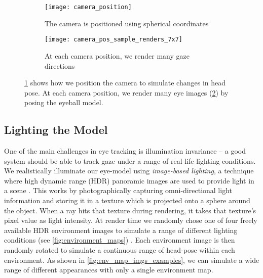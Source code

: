 \begin{figure}
    \centering
    \begin{subfigure}[t]{0.48\columnwidth}
        \texttt{[image: camera\_position]}
        \caption{The camera is positioned using spherical coordinates}
        \label{fig:cam_pos_spher_coords}
    \end{subfigure}
    \hfill
    \begin{subfigure}[t]{0.48\columnwidth}
        \texttt{[image: camera\_pos\_sample\_renders\_7x7]}
        \caption{At each camera position, we render many gaze directions}
        \label{fig:cam_pos_example_renders}
    \end{subfigure}
    \caption{\ref{fig:cam_pos_spher_coords} shows how we position the camera to simulate changes in head pose. At each camera position, we render many eye images (\ref{fig:cam_pos_example_renders}) by posing the eyeball model.}
    \label{fig:cam_pos}
\end{figure}

\subsection{Lighting the Model}

One of the main challenges in eye tracking is illumination invariance -- a good system should be able to track gaze under a range of real-life lighting conditions.
We realistically illuminate our eye-model using \emph{image-based lighting}, a technique where high dynamic range (HDR) panoramic images are used to provide light in a scene \cite{debevec2002image}.
This works by photographically capturing omni-directional light information and storing it in a texture which is projected onto a sphere around the object.
When a ray hits that texture during rendering, it takes that texture's pixel value as light intensity.
At render time we randomly chose one of four freely available HDR environment images to simulate a range of different lighting conditions (see \autoref{fig:environment_maps}) \cite{AdaptiveSamplesHDR}.
Each environment image is then randomly rotated to simulate a continuous range of head-pose within each environment. As shown in \autoref{fig:env_map_imgs_examples}, we can simulate a wide range of different appearances with only a single environment map.

